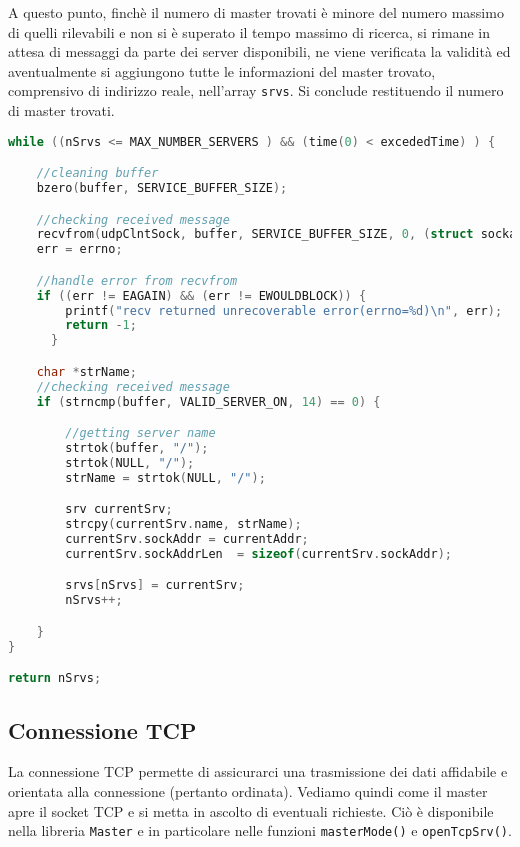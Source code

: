 \documentclass[11pt,fleqn]{book} %
\begin{document}
A questo punto, finchè il numero di master trovati è minore del numero massimo di quelli rilevabili e non si è superato il tempo massimo di ricerca, si rimane in attesa di messaggi da parte dei server disponibili, ne viene verificata la validità ed aventualmente si aggiungono tutte le informazioni del master trovato, comprensivo di indirizzo reale, nell'array \texttt{srvs}. Si conclude restituendo il numero di master trovati.

\begin{lstlisting}[language=C]
while ((nSrvs <= MAX_NUMBER_SERVERS ) && (time(0) < excededTime) ) {

	//cleaning buffer
	bzero(buffer, SERVICE_BUFFER_SIZE);

	//checking received message
	recvfrom(udpClntSock, buffer, SERVICE_BUFFER_SIZE, 0, (struct sockaddr *) &currentAddr, &currentAddrLen);
	err = errno;

	//handle error from recvfrom
	if ((err != EAGAIN) && (err != EWOULDBLOCK)) {
      	printf("recv returned unrecoverable error(errno=%d)\n", err);
      	return -1;
      }

	char *strName;
	//checking received message
	if (strncmp(buffer, VALID_SERVER_ON, 14) == 0) {

		//getting server name
		strtok(buffer, "/");
		strtok(NULL, "/");
		strName = strtok(NULL, "/");

		srv currentSrv;
		strcpy(currentSrv.name, strName);
		currentSrv.sockAddr = currentAddr;
		currentSrv.sockAddrLen  = sizeof(currentSrv.sockAddr);

		srvs[nSrvs] = currentSrv;
		nSrvs++;

	}	
}

return nSrvs;

\end{lstlisting}

\subsection{Connessione TCP}
La connessione TCP permette di assicurarci una trasmissione dei dati affidabile e orientata alla connessione (pertanto ordinata). Vediamo quindi come il master apre il socket TCP e si metta in ascolto di eventuali richieste.
Ciò è disponibile nella libreria \texttt{Master} e in particolare nelle funzioni \texttt{masterMode()} e \texttt{openTcpSrv()}.
\end{document}
